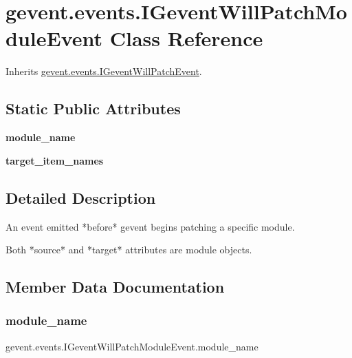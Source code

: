 \hypertarget{classgevent_1_1events_1_1_i_gevent_will_patch_module_event}{}\section{gevent.\+events.\+I\+Gevent\+Will\+Patch\+Module\+Event Class Reference}
\label{classgevent_1_1events_1_1_i_gevent_will_patch_module_event}


Inherits \hyperlink{classgevent_1_1events_1_1_i_gevent_will_patch_event}{gevent.\+events.\+I\+Gevent\+Will\+Patch\+Event}.

\subsection*{Static Public Attributes}
\begin{DoxyCompactItemize}
\item 
{\bfseries module\+\_\+name}
\item 
{\bfseries target\+\_\+item\+\_\+names}
\end{DoxyCompactItemize}


\subsection{Detailed Description}
\begin{DoxyVerb}An event emitted *before* gevent begins patching a specific module.

Both *source* and *target* attributes are module objects.
\end{DoxyVerb}
 

\subsection{Member Data Documentation}
\mbox{\label{classgevent_1_1events_1_1_i_gevent_will_patch_module_event_a143b490e1f3241b2bcfc682c48f4f312}} 
\subsubsection{\texorpdfstring{module\+\_\+name}{module\_name}}
{\footnotesize\ttfamily gevent.\+events.\+I\+Gevent\+Will\+Patch\+Module\+Event.\+module\+\_\+name\hspace{0.3cm}{\ttfamily [static]}}

